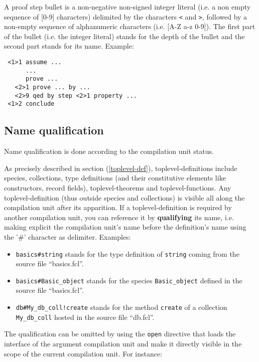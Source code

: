 A proof step bullet is a non-negative non-signed integer literal
(i.e. a non empty sequence of [0-9] characters) delimited by the
characters {\tt <} and {\tt >}, followed by a non-empty sequence of
alphanumeric characters (i.e. [A-Z a-z 0-9]).
The first part of the bullet (i.e. the integer literal) stands for the
depth of the bullet and the second part stands for its name. Example:
{\scriptsize
\begin{lstlisting}
 <1>1 assume ...
      ...
      prove ...
   <2>1 prove ... by ...
   <2>9 qed by step <2>1 property ...
 <1>2 conclude
\end{lstlisting}
}

\subsection{Name qualification}
\label{qualified-name}
 

Name qualification is done according to the
compilation unit status.

As precisely described in section (\ref{toplevel-def}),
toplevel-definitions include species, collections, type definitions
(and their constitutive elements like constructors, record fields),
toplevel-theorems and toplevel-functions.  Any toplevel-definition (thus
outside species and collections) is visible all along the compilation unit
after its apparition.
If a toplevel-definition is required by another compilation unit, you can
reference it by {\bf qualifying} its name, i.e. making explicit the
compilation unit's name before the definition's name using the '\#'
character as delimiter. Examples:

\begin{itemize}
  \item {\tt basics\#string} stands for the type definition of
    {\tt string} coming from the source file ``basics.fcl''.
  \item {\tt  basics\#Basic\_object} stands for the species
    {\tt Basic\_object} defined in the source file ``basics.fcl''.
  \item {\tt db\#My\_db\_coll!create} stands for the method
    {\tt create} of a collection {\tt My\_db\_coll} hosted in the
    source file ``db.fcl''.
\end{itemize}

The qualification can be omitted by using the {\tt open} directive
that loads the interface of the argument compilation unit and make it
directly visible in the scope of the current compilation unit. For
instance:

